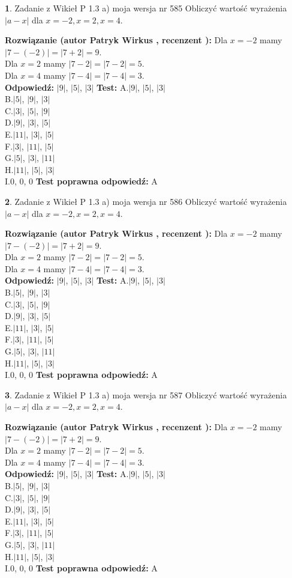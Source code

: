 \documentclass[12pt, a4paper]{article}
\theoremstyle{definition} %
\newtheorem{zad}{}
\newcommand{\zadStart}[1]{\begin{zad}#1\newline}
\newcommand{\zadStop}{\end{zad}}
\newcommand{\rozwStart}[2]{\noindent \textbf{Rozwiązanie (autor #1 , recenzent #2): }\newline}
\newcommand{\rozwStop}{\newline}
\newcommand{\odpStart}{\noindent \textbf{Odpowiedź:}\newline}
\newcommand{\odpStop}{\newline}
\newcommand{\testStart}{\noindent \textbf{Test:}\newline}
\newcommand{\testStop}{\newline}
\newcommand{\kluczStart}{\noindent \textbf{Test poprawna odpowiedź:}\newline}
\newcommand{\kluczStop}{\newline}
\begin{document}
\zadStart{Zadanie z Wikieł P 1.3 a) moja wersja nr 585}
Obliczyć wartość wyrażenia $|a - x|$ dla $x=-2,x=2,x=4$.
\zadStop
\rozwStart{Patryk Wirkus}{}
Dla $x = -2$ mamy $|7 - (-2)| = |7 + 2| = 9$.\\
Dla $x = 2$ mamy $|7 - 2| = |7 - 2| = 5$.\\
Dla $x = 4$ mamy $|7 - 4| = |7 - 4| = 3$.\\
\rozwStop
\odpStart
$|9|$, $|5|$, $|3|$
\odpStop
\testStart
A.$|9|$, $|5|$, $|3|$\\
B.$|5|$, $|9|$, $|3|$\\
C.$|3|$, $|5|$, $|9|$\\
D.$|9|$, $|3|$, $|5|$\\
E.$|11|$, $|3|$, $|5|$\\
F.$|3|$, $|11|$, $|5|$\\
G.$|5|$, $|3|$, $|11|$\\
H.$|11|$, $|5|$, $|3|$\\
I.$0$, $0$, $0$
\testStop
\kluczStart
A
\kluczStop



\zadStart{Zadanie z Wikieł P 1.3 a) moja wersja nr 586}
Obliczyć wartość wyrażenia $|a - x|$ dla $x=-2,x=2,x=4$.
\zadStop
\rozwStart{Patryk Wirkus}{}
Dla $x = -2$ mamy $|7 - (-2)| = |7 + 2| = 9$.\\
Dla $x = 2$ mamy $|7 - 2| = |7 - 2| = 5$.\\
Dla $x = 4$ mamy $|7 - 4| = |7 - 4| = 3$.\\
\rozwStop
\odpStart
$|9|$, $|5|$, $|3|$
\odpStop
\testStart
A.$|9|$, $|5|$, $|3|$\\
B.$|5|$, $|9|$, $|3|$\\
C.$|3|$, $|5|$, $|9|$\\
D.$|9|$, $|3|$, $|5|$\\
E.$|11|$, $|3|$, $|5|$\\
F.$|3|$, $|11|$, $|5|$\\
G.$|5|$, $|3|$, $|11|$\\
H.$|11|$, $|5|$, $|3|$\\
I.$0$, $0$, $0$
\testStop
\kluczStart
A
\kluczStop



\zadStart{Zadanie z Wikieł P 1.3 a) moja wersja nr 587}
Obliczyć wartość wyrażenia $|a - x|$ dla $x=-2,x=2,x=4$.
\zadStop
\rozwStart{Patryk Wirkus}{}
Dla $x = -2$ mamy $|7 - (-2)| = |7 + 2| = 9$.\\
Dla $x = 2$ mamy $|7 - 2| = |7 - 2| = 5$.\\
Dla $x = 4$ mamy $|7 - 4| = |7 - 4| = 3$.\\
\rozwStop
\odpStart
$|9|$, $|5|$, $|3|$
\odpStop
\testStart
A.$|9|$, $|5|$, $|3|$\\
B.$|5|$, $|9|$, $|3|$\\
C.$|3|$, $|5|$, $|9|$\\
D.$|9|$, $|3|$, $|5|$\\
E.$|11|$, $|3|$, $|5|$\\
F.$|3|$, $|11|$, $|5|$\\
G.$|5|$, $|3|$, $|11|$\\
H.$|11|$, $|5|$, $|3|$\\
I.$0$, $0$, $0$
\testStop
\kluczStart
A
\kluczStop
\end{document}
